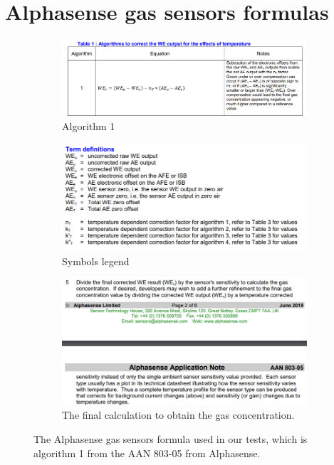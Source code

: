 \chapter{Alphasense gas sensors formulas}
\label{chapter:formulas}
\begin{figure}[H]
    \centering
    \begin{subfigure}[b]{0.6\textwidth}
        \centering
        \includegraphics[width=\textwidth]{images/alphasense-formulas/alg1.PNG}
        \caption{Algorithm 1}
        \label{fig:alg1}
    \end{subfigure}

    \begin{subfigure}[b]{0.6\textwidth}
        \centering
        \includegraphics[width=\textwidth]{images/alphasense-formulas/legend.PNG}
        \caption{Symbols legend}
        \label{fig:legend}
    \end{subfigure}
    
    \begin{subfigure}[b]{0.6\textwidth}
        \centering
        \includegraphics[width=\textwidth]{images/alphasense-formulas/5.PNG}
        \caption{The final calculation to obtain the gas concentration.}
        \label{fig:5}
    \end{subfigure}
       \caption{The Alphasense gas sensors formula used in our tests, which is algorithm 1 from the AAN 803-05 from Alphasense.}
       \label{fig:alphasense-formulas}
\end{figure}